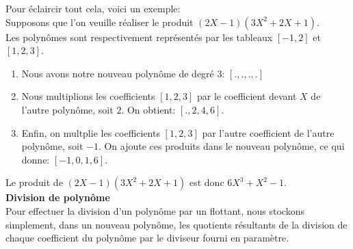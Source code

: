 \documentclass{report}
\begin{document}
Pour éclaircir tout cela, voici un exemple:\vspace{4pt}\\
Supposons que l'on veuille réaliser le produit $(2X-1)(3X^2+2X+1)$.\\
Les polynômes sont respectivement représentés par les tableaux $[-1, 2]$ et $[1, 2, 3]$.
\begin{enumerate}
    \item Nous avons notre nouveau polynôme de degré $3$: $[.,.,.,.]$
    \item Nous multiplions les coefficients $[1,2,3]$ par le coefficient devant $X$ de l'autre polynôme, soit $2$. On obtient: $[.,2,4,6]$.
    \item Enfin, on multplie les coefficients $[1,2,3]$ par l'autre coefficient de l'autre polynôme, soit $-1$. On ajoute ces produits dans le nouveau polynôme, ce qui donne: $[-1,0,1,6]$.
\end{enumerate}
Le produit de $(2X-1)(3X^2+2X+1)$ est donc $6X^3+X^2-1$.\vspace{4pt}\\
\textbf{Division de polynôme}\\
Pour effectuer la division d'un polynôme par un flottant, nous stockons simplement, dans un nouveau polynôme, les quotients résultants de la division de chaque coefficient du polynôme par le diviseur fourni en paramètre.
\newpage
\end{document}

